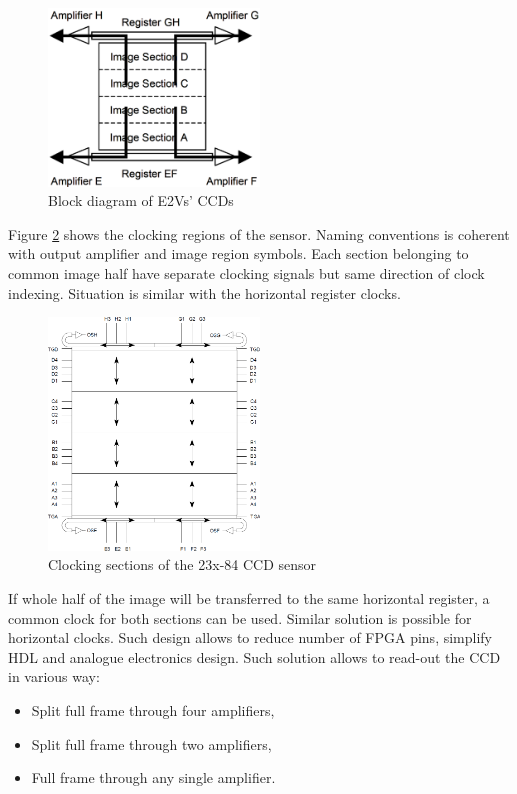 \begin{figure}[ht!]
\centering
\includegraphics[width=0.5\textwidth]{pict/CCD_sections.png}
\caption{Block diagram of E2Vs' CCDs}
\label{fig:CCD_sections}
\end{figure}


Figure \ref{fig:CCD_IOs} shows the clocking regions of the sensor. Naming conventions is coherent with output amplifier and image region symbols. Each section belonging to common image half have separate clocking signals but same direction of clock indexing. Situation is similar with the horizontal register clocks. 

\begin{figure}[ht!]
\centering
\includegraphics[width=0.5\textwidth]{pict/CCD_IOs.png}
\caption{Clocking sections of the 23x-84 CCD sensor}
\label{fig:CCD_IOs}
\end{figure}

If whole half of the image will be transferred to the same horizontal register, a common clock for both sections can be used. Similar solution is possible for horizontal clocks. Such design allows to reduce number of FPGA pins, simplify HDL and analogue electronics design. Such solution allows to read-out the CCD in various way:
\begin{itemize}
\item Split full frame through four amplifiers,
\item Split full frame through two amplifiers,
\item Full frame through any single amplifier.
\end{itemize}

